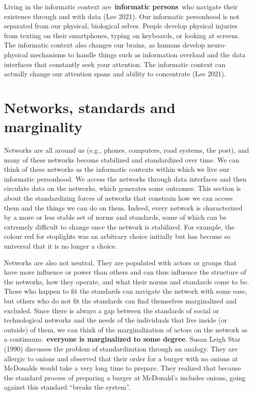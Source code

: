 \documentclass[
  letterpaper,
  DIV=11,
  numbers=noendperiod]{scrreprt}
\begin{document}
Living in the informatic context are~\textbf{informatic persons}~who
navigate their existence through and with data (Lee 2021). Our
informatic personhood is not separated from our physical, biological
selves. People develop physical injuries from texting on their
smartphones, typing on keyboards, or looking at screens. The informatic
context also changes our brains, as humans develop neuro-physical
mechanisms to handle things such as information overload and the data
interfaces that constantly seek your attention. The informatic context
can actually change our attention spans and ability to concentrate (Lee
2021).

\section{Networks, standards and
marginality}\label{networks-standards-and-marginality}

Networks are all around us (e.g., phones, computers, road systems, the
post), and many of these networks become stabilized and standardized
over time. We can think of these networks as the informatic contexts
within which we live our informatic personhood. We access the networks
through data interfaces and then circulate data on the networks, which
generates some outcomes. This section is about the standardizing forces
of networks that constrain how we can access them and the things we can
do on them. Indeed, every network is characterized by a more or less
stable set of norms and standards, some of which can be extremely
difficult to change once the network is stabilized. For example, the
colour red for stoplights was an arbitrary choice initially but has
become so universal that it is no longer a choice.

Networks are also not neutral. They are populated with actors or groups
that have more influence or power than others and can thus influence the
structure of the networks, how they operate, and what their norms and
standards come to be. Those who happen to fit the standards can navigate
the network with some ease, but others who do not fit the standards can
find themselves marginalized and excluded. Since there is always a gap
between the standards of social or technological networks and the needs
of the individuals that live inside (or outside) of them, we can think
of the marginalization of actors on the network as a
continuum:~\textbf{everyone is marginalized to some degree}. Susan Leigh
Star (1990) discusses the problem of standardization through an analogy.
They are allergic to onions and observed that their order for a burger
with no onions at McDonalds would take a very long time to prepare. They
realized that because the standard process of preparing a burger at
McDonald's includes onions, going against this standard ``breaks the
system''.
\end{document}
